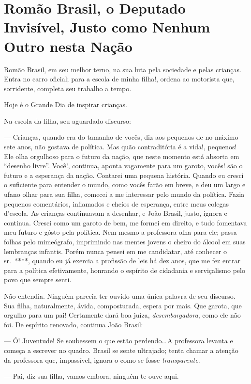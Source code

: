 \chapter[Romão Brasil, o Deputado Invisível]{Romão Brasil, o Deputado Invisível, Justo como Nenhum Outro nesta Nação}

Romão Brasil, em seu melhor terno, na sua luta pela sociedade e pelas crianças. Entra no carro oficial; para a escola de minha filha!, ordena ao motorista que, sorridente, completa seu trabalho a tempo.

Hoje é o Grande Dia de inspirar crianças.

Na escola da filha, seu aguardado discurso:

--- Crianças, quando era do tamanho de vocês, diz aos pequenos de no máximo sete anos, não gostava de política. Mas quão contraditória é a vida!, pequenos! Ele olha orgulhoso para o futuro da nação, que neste momento está absorta em ``desenho livre''. Você!, continua, aponta vagamente para um garoto, vocês! são o futuro e a esperança da nação. Contarei uma pequena história. Quando eu cresci o suficiente para entender o mundo, como vocês farão em breve, e deu um largo e ufano olhar para sua filha, comecei a me interessar pelo mundo da política. Fazia pequenos comentários, inflamados e cheios de esperança, entre meus colegas d'escola. As crianças continuavam a desenhar, e João Brasil, justo, ignora e continua. Cresci como um garoto de bem, me formei em direito, e tudo fomentava meu futuro e gôsto pela política. Nem mesmo a professora olha para ele; passa folhas pelo mimeógrafo, imprimindo nas mentes jovens o cheiro do álcool em suas lembranças infantis. Porém nunca pensei em me candidatar, até conhecer o sr.~****, quando eu já exercia a profissão de leis há dez anos, que me fez entrar para a política efetivamente, honrando o espírito de cidadania e serviçalismo pelo povo que sempre senti.

Não entendia. Ninguém parecia ter ouvido uma única palavra de seu discurso. Sua filha, naturalmente, ávida, composturada, espera por mais. Que garota, que orgulho para um pai! Certamente dará boa juíza, \emph{desembargadora}, como ele não foi. De espírito renovado, continua João Brasil:

--- Ó! Juventude! Se soubessem o que estão perdendo\ldots\,A professora levanta e começa a escrever no quadro. Brasil se sente ultrajado; tenta chamar a atenção da professora que, impassível, ignora-o como se fosse \emph{transparente}.

--- Pai, diz sua filha, vamos embora, ninguém te ouve aqui.

